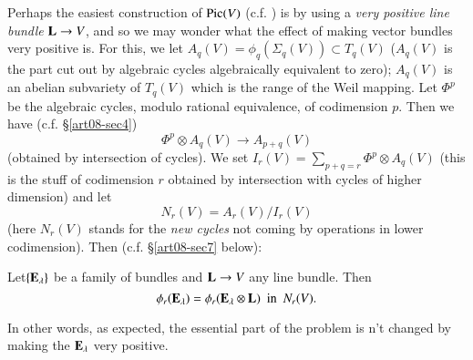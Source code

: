 \begin{example}\label{art08-sec6-exam4}
Perhaps the easiest construction of $\operatorname{\mathrm{Pic}}(V)$ (c.f. \cite{art08-key18}) is by using a {\em very positive line bundle} $\mathbf{L}\to V$, and so we may wonder what the effect of making vector bundles very positive is. For this, we let $A_{q}(V)=\phi_{q}(\Sigma_{q}(V))\subset T_{q}(V)$ ($A_{q}(V)$ is the part cut out by algebraic cycles algebraically equivalent to zero); $A_{q}(V)$ is an abelian subvariety of $T_{q}(V)$ which is the range of the Weil mapping. Let $\Phi^{p}$ be the algebraic cycles, modulo rational equivalence, of codimension $p$. Then we have (c.f. \S\ref{art08-sec4})
\begin{equation}
\Phi^{p}\otimes A_{q}(V)\to A_{p+q}(V)\label{art08-sec6-eq6.11}
\end{equation}
(obtained by intersection of cycles). We set $I_{r}(V)=\sum\limits_{p+q=r}\Phi^{p}\otimes A_{q}(V)$ (this is the stuff of codimension $r$ obtained by intersection with cycles of higher dimension) and let
\begin{equation}
N_{r}(V)=A_{r}(V)/I_{r}(V)\label{art08-sec6-eq6.12}
\end{equation}
(here $N_{r}(V)$ stands for the {\em new cycles} not coming by operations in lower codimension). Then (c.f. \S\ref{art08-sec7} below):
\end{example}

Let\pageoriginale $\{\mathbf{E}_{\lambda}\}$ be a family of bundles and $\mathbf{L}\to V$ any line bundle. Then 
\begin{equation}
\phi_{r}(\mathbf{E}_{\lambda})=\phi_{r}(\mathbf{E}_{\lambda}\otimes \mathbf{L})\text{~ in~ } N_{r}(V).\label{art08-sec6-eq6.13}
\end{equation}

In other words, as expected, the essential part of the problem is n't changed by making the $\mathbf{E}_{\lambda}$ very positive.

